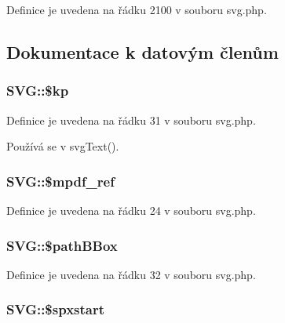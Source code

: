 Definice je uvedena na řádku 2100 v souboru svg.\-php.



\subsection{Dokumentace k datovým členům}
\hypertarget{class_s_v_g_a7857b1fd0054ec4ed4762689d12f4759}{
\subsubsection[{\$kp}]{\setlength{\rightskip}{0pt plus 5cm}S\-V\-G\-::\$kp}}\label{class_s_v_g_a7857b1fd0054ec4ed4762689d12f4759}


Definice je uvedena na řádku 31 v souboru svg.\-php.



Používá se v svg\-Text().

\hypertarget{class_s_v_g_ac1da703f34d7051884c1e778806966dc}{
\subsubsection[{\$mpdf\-\_\-ref}]{\setlength{\rightskip}{0pt plus 5cm}S\-V\-G\-::\$mpdf\-\_\-ref}}\label{class_s_v_g_ac1da703f34d7051884c1e778806966dc}


Definice je uvedena na řádku 24 v souboru svg.\-php.

\hypertarget{class_s_v_g_a34563ad38713f2ed92a13eae09bfe86c}{
\subsubsection[{\$path\-B\-Box}]{\setlength{\rightskip}{0pt plus 5cm}S\-V\-G\-::\$path\-B\-Box}}\label{class_s_v_g_a34563ad38713f2ed92a13eae09bfe86c}


Definice je uvedena na řádku 32 v souboru svg.\-php.

\hypertarget{class_s_v_g_a902d9988c9b8156ba4d50e9193744e34}{
\subsubsection[{\$spxstart}]{\setlength{\rightskip}{0pt plus 5cm}S\-V\-G\-::\$spxstart}}\label{class_s_v_g_a902d9988c9b8156ba4d50e9193744e34}


